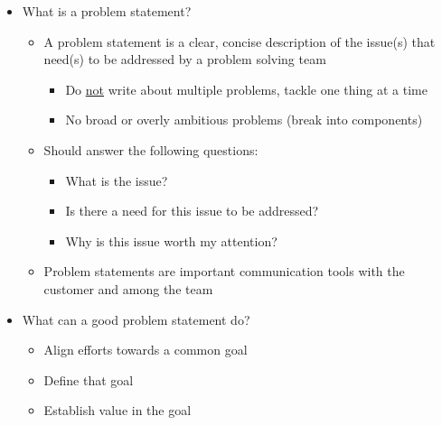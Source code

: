 \begin{itemize}

  \item What is a problem statement?

    \begin{itemize}

      \item A problem statement is a clear, concise description of the issue(s) that need(s) to be addressed by a problem solving team

        \begin{itemize}

          \item Do \underline{not} write about multiple problems, tackle one thing at a time

          \item No broad or overly ambitious problems (break into components)

        \end{itemize}

      \item Should answer the following questions:

        \begin{itemize}

          \item What is the issue?

          \item Is there a need for this issue to be addressed?

          \item Why is this issue worth my attention?

        \end{itemize}

      \item Problem statements are important communication tools with the customer and among the team

    \end{itemize}

  \item What can a good problem statement do?

    \begin{itemize}

      \item Align efforts towards a common goal

      \item Define that goal

      \item Establish value in the goal


\end{itemize}
\end{itemize}
